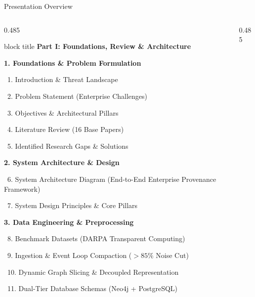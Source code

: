 \documentclass[aspectratio=169,10pt]{beamer}
\begin{document}
\begin{frame}{Presentation Overview}
\vspace{-0.3em}
\begin{columns}[T]
\begin{column}{0.485\textwidth}
\begin{beamercolorbox}[rounded=true,shadow=false,sep=0.25em,wd=\textwidth]{block title}
\textbf{\scriptsize Part I: Foundations, Review \& Architecture}
\end{beamercolorbox}
\vspace{0.15em}
{\fontsize{6.2pt}{8.4pt}\selectfont
\textbf{\textcolor{prismNavy}{1. Foundations \& Problem Formulation}}\par\vspace{0.05em}
\textbullet~1. Introduction \& Threat Landscape\par
\textbullet~2. Problem Statement (Enterprise Challenges)\par
\textbullet~3. Objectives \& Architectural Pillars\par
\textbullet~4. Literature Review (16 Base Papers)\par
\textbullet~5. Identified Research Gaps \& Solutions\par\vspace{0.30em}
\textbf{\textcolor{prismNavy}{2. System Architecture \& Design}}\par\vspace{0.05em}
\textbullet~6. System Architecture Diagram (End-to-End Enterprise Provenance Framework)\par
\textbullet~7. System Design Principles \& Core Pillars\par\vspace{0.30em}
\textbf{\textcolor{prismNavy}{3. Data Engineering \& Preprocessing}}\par\vspace{0.05em}
\textbullet~8. Benchmark Datasets (DARPA Transparent Computing)\par
\textbullet~9. Ingestion \& Event Loop Compaction ($>85\%$ Noise Cut)\par
\textbullet~10. Dynamic Graph Slicing \& Decoupled Representation\par
\textbullet~11. Dual-Tier Database Schemas (Neo4j + PostgreSQL)
}
\end{column}
\begin{column}{0.485\textwidth}

\end{column}
\end{columns}
\end{frame}
\end{document}
